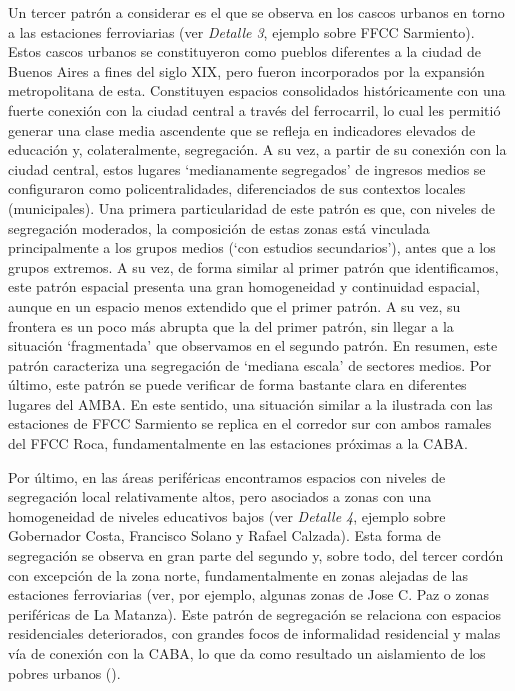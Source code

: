 \documentclass[
  spanish,
  a4paper,%
  chapterprefix=true,%
  DIV=calc,%
  twoside]{scrbook}%
\begin{document}
Un tercer patrón a considerar es el que se observa en los cascos urbanos
en torno a las estaciones ferroviarias (ver \emph{Detalle 3}, ejemplo sobre
FFCC Sarmiento). Estos cascos urbanos se constituyeron como pueblos
diferentes a la ciudad de Buenos Aires a fines del siglo XIX, pero
fueron incorporados por la expansión metropolitana de esta. Constituyen
espacios consolidados históricamente con una fuerte conexión con la
ciudad central a través del ferrocarril, lo cual les permitió generar
una clase media ascendente que se refleja en indicadores elevados de
educación y, colateralmente, segregación. A su vez, a partir de su
conexión con la ciudad central, estos lugares `medianamente segregados'
de ingresos medios se configuraron como policentralidades, diferenciados
de sus contextos locales (municipales). Una primera particularidad de
este patrón es que, con niveles de segregación moderados, la composición
de estas zonas está vinculada principalmente a los grupos medios (`con
estudios secundarios'), antes que a los grupos extremos. A su vez, de
forma similar al primer patrón que identificamos, este patrón espacial
presenta una gran homogeneidad y continuidad espacial, aunque en un
espacio menos extendido que el primer patrón. A su vez, su frontera es
un poco más abrupta que la del primer patrón, sin llegar a la situación
`fragmentada' que observamos en el segundo patrón. En resumen, este
patrón caracteriza una segregación de `mediana escala' de sectores
medios. Por último, este patrón se puede verificar de forma bastante
clara en diferentes lugares del AMBA. En este sentido, una situación
similar a la ilustrada con las estaciones de FFCC Sarmiento se replica
en el corredor sur con ambos ramales del FFCC Roca, fundamentalmente en
las estaciones próximas a la CABA.

Por último, en las áreas periféricas encontramos espacios con niveles de
segregación local relativamente altos, pero asociados a zonas con una
homogeneidad de niveles educativos bajos (ver \emph{Detalle 4}, ejemplo sobre
Gobernador Costa, Francisco Solano y Rafael Calzada). Esta forma de
segregación se observa en gran parte del segundo y, sobre todo, del
tercer cordón con excepción de la zona norte, fundamentalmente en zonas
alejadas de las estaciones ferroviarias (ver, por ejemplo, algunas zonas
de Jose C. Paz o zonas periféricas de La Matanza). Este patrón de
segregación se relaciona con espacios residenciales deteriorados, con
grandes focos de informalidad residencial y malas vía de conexión con la
CABA, lo que da como resultado un aislamiento de los pobres urbanos
().
\end{document}
